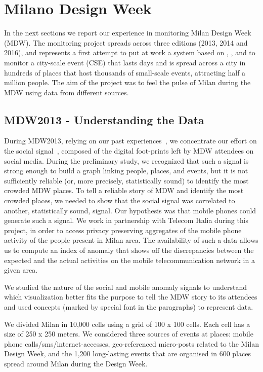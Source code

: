 \section{Milano Design Week} \label{sec:cs-mdw}
In the next sections we report our experience in monitoring Milan Design Week  (MDW).
The monitoring project spreads across three editions (2013, 2014 and 2016), and represents a first attempt to put at work a system based on \frappe{}, \sti{}, \hivedi{} and \sparkdi{} to monitor a city-scale event (CSE) that lasts days and is spread across a city in hundreds of places that host thousands of small-scale events, attracting half a million people.
The aim of the project was to feel the pulse of Milan during the MDW using data from different sources.

\subsection{MDW2013 - Understanding the Data} \label{sec:cs-mdw-2013}
During MDW2013, relying on our past experiences~\cite{DBLP:conf/semweb/BalduiniVDTPC13,DBLP:journals/internet/BalduiniBVHH14}, we concentrate our effort on the social signal~\cite{pentland2007social}, composed of the digital foot-prints left by MDW attendees on social media. 
During the preliminary study, we recognized that such a signal is strong enough to build a graph linking people, places, and events, but it is not sufficiently reliable (or, more precisely, statistically sound) to identify the most crowded MDW places. 
To tell a reliable story of MDW and identify the most crowded places, we needed to show that the social signal was correlated to another, statistically sound, signal. Our hypothesis was that mobile phones could generate such a signal.
We work in partnership with Telecom Italia during this project, in order to access privacy preserving aggregates of the mobile phone activity of the people present in Milan area. 
The availability of such a data allows us to compute an index of anomaly that shows off the discrepancies between the expected and the actual activities on the mobile telecommunication network in a given area.

We studied the nature of the social and mobile anomaly signals to understand which visualization better fits the purpose to tell the MDW story to its attendees and used \frappe{} concepts (marked by special font in the paragraphs) to represent data.

We divided Milan in 10,000 \textsf{cell}s using a grid of 100 x 100 cells. Each cell has a size of 250 x 250 meters. We considered three sources of \textsf{event}s at \textsf{place}s: mobile phone calls/sms/internet-accesses, geo-referenced micro-posts related to the Milan Design Week, and the 1,200 long-lasting events that are organised in 600 places spread around Milan during the Design Week. 


